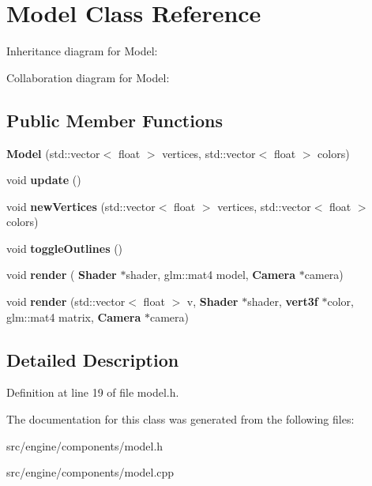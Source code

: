 \section{Model Class Reference}
\label{class_model}


Inheritance diagram for Model\+:


Collaboration diagram for Model\+:
\subsection*{Public Member Functions}
\begin{DoxyCompactItemize}
\item 
\mbox{\label{class_model_afbed5ca8ab6fd4baeb77db578d78da0a}} 
{\bfseries Model} (std\+::vector$<$ float $>$ vertices, std\+::vector$<$ float $>$ colors)
\item 
\mbox{\label{class_model_a8976f84f757eb3cd68b2aa7eeb5a345f}} 
void {\bfseries update} ()
\item 
\mbox{\label{class_model_a94a685b59f3881323fec2fca2838fa30}} 
void {\bfseries new\+Vertices} (std\+::vector$<$ float $>$ vertices, std\+::vector$<$ float $>$ colors)
\item 
\mbox{\label{class_model_a95b5f22bdd6d6c947c885a5da60e3715}} 
void {\bfseries toggle\+Outlines} ()
\item 
\mbox{\label{class_model_a20d537bcbc8dc21f2b0615b6c1ef1780}} 
void {\bfseries render} (\textbf{ Shader} $\ast$shader, glm\+::mat4 model, \textbf{ Camera} $\ast$camera)
\item 
\mbox{\label{class_model_afb263822b52d16f82c848940c9d36d78}} 
void {\bfseries render} (std\+::vector$<$ float $>$ v, \textbf{ Shader} $\ast$shader, \textbf{ vert3f} $\ast$color, glm\+::mat4 matrix, \textbf{ Camera} $\ast$camera)
\end{DoxyCompactItemize}


\subsection{Detailed Description}


Definition at line 19 of file model.\+h.



The documentation for this class was generated from the following files\+:\begin{DoxyCompactItemize}
\item 
src/engine/components/model.\+h\item 
src/engine/components/model.\+cpp\end{DoxyCompactItemize}
